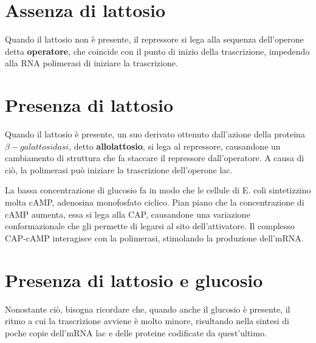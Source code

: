 \documentclass[10pt,a4paper]{article}
\begin{document}
	\section{Assenza di lattosio}
	
	Quando il lattosio non è presente, il repressore si lega alla sequenza dell'operone detta \textbf{operatore}, che coincide con il punto di inizio della trascrizione, impedendo alla RNA polimerasi di iniziare la trascrizione.
	
	\section{Presenza di lattosio}
	
	Quando il lattosio è presente, un suo derivato ottenuto dall'azione della proteina $\beta-galattosidasi$, detto \textbf{allolattosio}, si lega al repressore, causandone un cambiamento di struttura che fa staccare il repressore dall'operatore. A causa di ciò, la polimerasi può iniziare la trascrizione dell'operone lac.
	
	La bassa concentrazione di glucosio fa in modo che le cellule di E. coli sintetizzino molta cAMP, adenosina monofosfato ciclico. Pian piano che la concentrazione di cAMP aumenta, essa si lega alla CAP, causandone una variazione conformazionale che gli permette di legarsi al sito dell'attivatore. Il complesso CAP-cAMP interagisce con la polimerasi, stimolando la produzione dell'mRNA.
	
	\section{Presenza di lattosio e glucosio}
	
	Nonostante ciò, bisogna ricordare che, quando anche il glucosio è presente, il ritmo a cui la trascrizione avviene è molto minore, risultando nella sintesi di poche copie dell'mRNA lac e delle proteine codificate da quest'ultimo.
	
\end{document}
